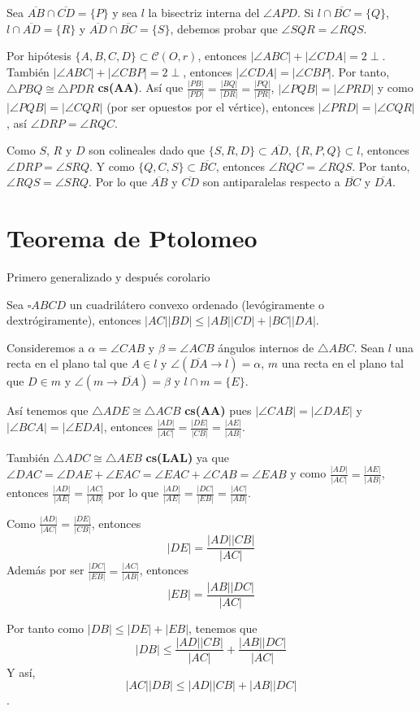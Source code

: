 \begin{pba}
Sea $\overline{AB}\cap\overline{CD}=\{P\}$ y sea $l$ la bisectriz interna del $\angle APD$. 
Si $l\cap\overline{BC}=\{Q\}$, $l\cap\overline{AD}=\{R\}$ y $\overline{AD}\cap\overline{BC}=\{S\}$, debemos probar que $\angle SQR=\angle RQS$.

Por hipótesis $\{A,B,C,D\}\subset\mathcal{C}(O,r)$, entonces $|\angle ABC|+|\angle CDA|=2\perp$. También $|\angle ABC|+|\angle CBP|=2\perp$, entonces $|\angle CDA|=|\angle CBP|$. Por tanto, $\triangle PBQ\cong\triangle PDR$ \textbf{cs(AA)}. Así que $\frac{|PB|}{|PD|}=\frac{|BQ|}{|DR|}=\frac{|PQ|}{|PR|}$, $|\angle PQB|=|\angle PRD|$ y como $|\angle PQB|=|\angle CQR|$  (por ser opuestos por el vértice), entonces $|\angle PRD|=|\angle CQR|$, así $\angle DRP=\angle RQC$. 

Como $S$, $R$ y $D$ son colineales dado que $\{S,R,D\}\subset\overline{AD}$, $\{R,P,Q\}\subset l$, entonces $\angle DRP=\angle SRQ$. Y como $\{Q,C,S\}\subset\overline{BC}$, entonces $\angle RQC=\angle RQS$. Por tanto, $\angle RQS=\angle SRQ$.
Por lo que $\overline{AB}$ y $\overline{CD}$ son antiparalelas respecto a $\overline{BC}$ y $\overline{DA}$.
\end{pba}

\section{Teorema de Ptolomeo}

Primero generalizado y después corolario

\begin{teo}
Sea $\square ABCD$ un cuadrilátero convexo ordenado (levógiramente o dextrógiramente), entonces $|AC||BD|\leq |AB||CD|+|BC||DA|.$
\end{teo}
\begin{dem}
Consideremos a $\alpha=\angle CAB$ y $\beta=\angle ACB$ ángulos internos de $\triangle ABC$.
Sean $l$ una recta en el plano tal que $A\in l$ y $\angle (\overline{DA}\longrightarrow l)=\alpha$, $m$ una recta en el plano tal que $D\in m$ y $\angle(m\longrightarrow\overline{DA})=\beta$ y $l\cap m=\{E\}$.

Así tenemos que $\triangle ADE\cong\triangle ACB$ \textbf{cs(AA)} pues $|\angle CAB|=|\angle DAE|$ y $|\angle BCA|=|\angle EDA|$, entonces $\frac{|AD|}{|AC|}=\frac{|DE|}{|CB|}=\frac{|AE|}{|AB|}$.

También $\triangle ADC\cong\triangle AEB$ \textbf{cs(LAL)} ya que $\angle DAC=\angle DAE+\angle EAC=\angle EAC+\angle CAB=\angle EAB$ y como $\frac{|AD|}{|AC|}=\frac{|AE|}{|AB|}$, entonces $\frac{|AD|}{|AE|}=\frac{|AC|}{|AB|}$ por lo que $\frac{|AD|}{|AE|}=\frac{|DC|}{|EB|}=\frac{|AC|}{|AB|}$.

Como $\frac{|AD|}{|AC|}=\frac{|DE|}{|CB|}$, entonces
$$|DE|=\frac{|AD||CB|}{|AC|}$$
Además por ser $\frac{|DC|}{|EB|}=\frac{|AC|}{|AB|}$, entonces
$$|EB|=\frac{|AB||DC|}{|AC|}$$

Por tanto como $|DB|\leq |DE|+|EB|$, tenemos que 
$$|DB|\leq \frac{|AD||CB|}{|AC|}+\frac{|AB||DC|}{|AC|}$$
Y así,
$$|AC||DB|\leq |AD||CB|+|AB||DC|$$.
\end{dem}


